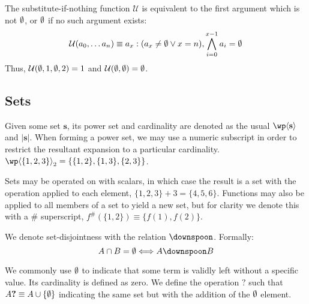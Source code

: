 

The substitute-if-nothing function $\mathcal{U}$ is equivalent to the first argument which is not $\emptyset$, or $\emptyset$ if no such argument exists:
\begin{align}\label{eq:substituteifnothing}
  \mathcal{U}(a_0, \dots a_n ) \equiv a_x : (a_x \ne \emptyset \vee x = n), \bigwedge_{i=0}^{x-1} a_i = \emptyset
\end{align}
Thus, \eg $\mathcal{U}(\emptyset, 1, \emptyset, 2) = 1$ and $\mathcal{U}(\emptyset, \emptyset) = \emptyset$.

\subsection{Sets}\label{sec:sets}

Given some set $\mathbf{s}$, its power set and cardinality are denoted as the usual $\powset{\mathbf{s}}$ and $|\mathbf{s}|$. When forming a power set, we may use a numeric subscript in order to restrict the resultant expansion to a particular cardinality. \Eg $\powset[2]{\{1, 2, 3\}} = \{ \{1, 2\}, \{1, 3\}, \{2, 3\} \}$.

Sets may be operated on with scalars, in which case the result is a set with the operation applied to each element, \eg $\{1, 2, 3\} + 3 = \{4, 5, 6\}$. Functions may also be applied to all members of a set to yield a new set, but for clarity we denote this with a $\#$ superscript, \eg $f^{\#}(\{1, 2\}) \equiv \{f(1), f(2)\}$.

We denote set-disjointness with the relation $\disjoint$. Formally:
\begin{equation*}
  A \cap B = \none \Longleftrightarrow A \disjoint B
\end{equation*}

We commonly use $\emptyset$ to indicate that some term is validly left without a specific value. Its cardinality is defined as zero. We define the operation $\bm{?}$ such that $A\bm{?} \equiv A \cup \{\emptyset\}$ indicating the same set but with the addition of the $\emptyset$ element.

